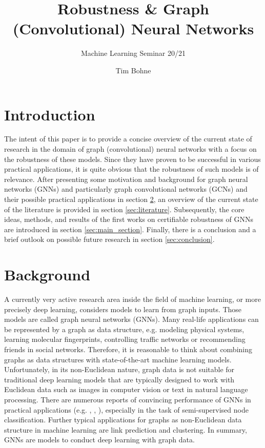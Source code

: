 \documentclass[a4paper,preprint]{sig-alternate}
\begin{document}
\title{Robustness \& Graph (Convolutional) Neural Networks}

\subtitle{Machine Learning Seminar 20/21}

%
\author{
%
\alignauthor Tim Bohne\\
}

\maketitle

\section{Introduction}

The intent of this paper is to provide a concise overview of the current state of research in the domain of graph (convolutional) neural networks
with a focus on the robustness of these models. Since they have proven to be successful in various practical applications, 
it is quite obvious that the robustness of such models is of relevance.
After presenting some motivation and background for graph neural networks (GNNs) and particularly graph convolutional networks (GCNs)
and their possible practical applications in section \ref{sec:background}, an overview of the current state of the literature is
provided in section \ref{sec:literature}. Subsequently, the core ideas, methods, and results of the first works on certifiable
robustness of GNNs are introduced in section \ref{sec:main_section}.
Finally, there is a conclusion and a brief outlook on possible future research in section \ref{sec:conclusion}.

\section{Background}
\label{sec:background}

A currently very active research area inside the field of machine learning, or more precisely deep learning, considers models to learn
from graph inputs. Those models are called graph neural networks (GNNs). 
Many real-life applications can be represented by a graph as data structure, e.g. modeling physical systems, learning molecular fingerprints,
controlling traffic networks or recommending friends in social networks. \cite{Liu_2020}
Therefore, it is reasonable to think about combining graphs as data structures with state-of-the-art machine learning models.
Unfortunately, in its non-Euclidean nature, graph data is not suitable for traditional deep learning models that are typically designed 
to work with Euclidean data such as images in computer vision or text in natural language processing. \cite{Liu_2020}
There are numerous reports of convincing performance of GNNs in practical applications (e.g. \cite{NIPS2015_f9be311e},
\cite{hamilton2018inductive}, \cite{trivedi2017knowevolve}), especially in the task of semi-supervised node classification. \cite{xu2019topology}
Further typical applications for graphs as non-Euclidean data structure in machine learning are link prediction and clustering. \cite{Zhou_2019}
In summary, GNNs are models to conduct deep learning with graph data.
\end{document}
